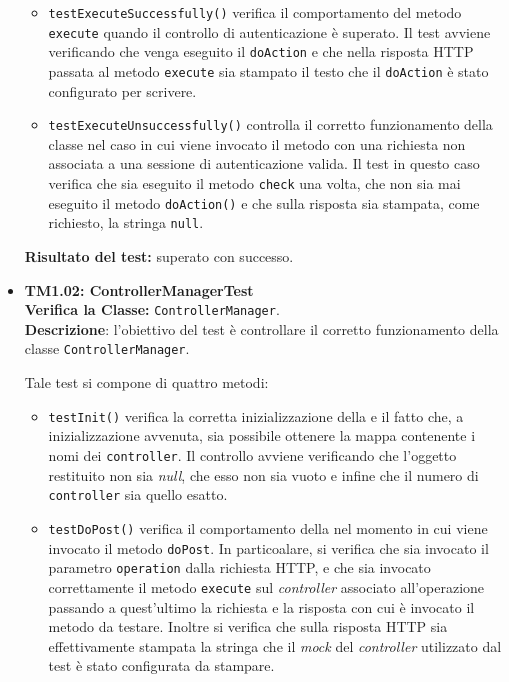 \begin{itemize}
\begin{itemize}
\item \texttt{testExecuteSuccessfully()} verifica il comportamento del metodo \texttt{execute} quando il controllo di autenticazione è superato. Il test avviene verificando che venga eseguito il \texttt{doAction} e che nella risposta HTTP passata al metodo \texttt{execute} sia  stampato il testo che il \texttt{doAction} è stato configurato per scrivere.

\item \texttt{testExecuteUnsuccessfully()}
controlla il corretto funzionamento della classe nel caso in cui viene invocato il metodo con una richiesta non associata a una sessione di autenticazione valida.
Il test in questo caso verifica che sia eseguito il metodo \texttt{check} una volta, che non sia mai eseguito il metodo \texttt{doAction()} e che sulla risposta sia stampata, come richiesto, la stringa \texttt{null}.

 \end{itemize}
\textbf{Risultato del test:} superato con successo.

\item \textbf{TM1.02: ControllerManagerTest}\\
\textbf{Verifica la Classe:} \texttt{ControllerManager}.\\
\textbf{Descrizione}: l'obiettivo del test è controllare il corretto funzionamento della classe \texttt{ControllerManager}.
 
Tale test si compone di quattro metodi:
 \begin{itemize}
 
\item \texttt{testInit()} verifica la corretta inizializzazione della  e il fatto che, a inizializzazione avvenuta, sia possibile ottenere la mappa contenente i nomi dei \texttt{controller}. Il controllo avviene verificando che l'oggetto restituito non sia \textsl{null}, che esso non sia vuoto e infine che il numero di \texttt{controller} sia quello esatto.

\item \texttt{testDoPost()} verifica il comportamento della  nel momento in cui viene invocato il metodo \texttt{doPost}. In particoalare, si verifica che sia invocato il parametro \texttt{operation} dalla richiesta HTTP, e che sia invocato correttamente il metodo \texttt{execute} sul \textit{controller} associato all'operazione passando a quest'ultimo la richiesta e la risposta con cui è invocato il metodo da testare. Inoltre si verifica che sulla risposta HTTP sia effettivamente stampata la stringa che il \textit{mock} del \textit{controller} utilizzato dal test è stato configurata da stampare.


\end{itemize}
\end{itemize}
